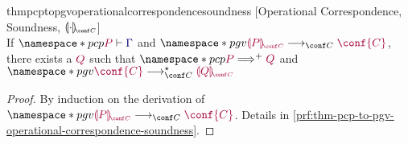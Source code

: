 \documentclass[main.tex]{subfiles}
\begin{document}
\begin{restatabletheorem}{thmpcptopgvoperationalcorrespondencesoundness}%
  [Operational Correspondence, Soundness, $\cpgvC{\cdot}$]
  \label{thm:pcp-to-pgv-operational-correspondence-soundness}
  \hfill\\%
  If $\pcp{\seq{P}{\ty{\Gamma}}}$ and $\pgv{\tm{\cpgvC{P}}\cred\tm{\conf{C}}}$,
  there exists a $\tm{Q}$ such that $\pcp{\tm{P}\red^+\tm{Q}}$ and $\pgv{\tm{\conf{C}}\cred^\star\tm{\cpgvC{Q}}}$
\end{restatabletheorem}
\begin{proof}
  By induction on the derivation of $\pgv{\tm{\cpgvC{P}}\cred\tm{\conf{C}}}$.
  Details in \cref{prf:thm-pcp-to-pgv-operational-correspondence-soundness}.
\end{proof}
\end{document}
